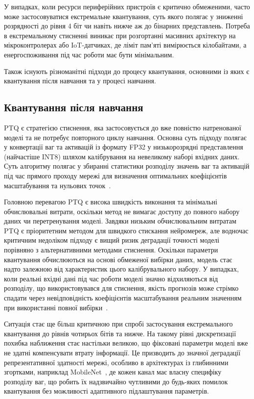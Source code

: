 \documentclass{pma-mthesis}
\begin{document}
У випадках, коли ресурси периферійних пристроїв є критично обмеженими, часто може застосовуватися екстремальне квантування, суть якого полягає у зниженні розрядності до рівня 4 біт чи навіть нижче аж до бінарних представлень. Потреба в екстремальному стисненні виникає при розгортанні масивних архітектур на мікроконтролерах або IoT-датчиках, де ліміт пам'яті вимірюється кілобайтами, а енергоспоживання під час роботи має бути мінімальним.

Також існують різноманітні підходи до процесу квантування, основними із яких є квантування після навчання та у процесі навчання.

\subsection{Квантування після навчання}

PTQ є стратегією стиснення, яка застосовується до вже повністю натренованої моделі та не потребує повторного циклу навчання. Основна суть підходу полягає у конвертації ваг та активацій із формату FP32 у низькорозрядні представлення (найчастіше INT8) шляхом калібрування на невеликому наборі вхідних даних. Суть алгоритму полягає у збиранні статистики розподілу значень ваг та активацій під час прямого проходу мережі для визначення оптимальних коефіцієнтів масштабування та нульових точок~\cite{krishnamoorthi2018quantizing}.

Головною перевагою PTQ є висока швидкість виконання та мінімальні обчислювальні витрати, оскільки метод не вимагає доступу до повного набору даних чи перетренування моделі. Завдяки низьким обчислювальним витратам PTQ є пріоритетним методом для швидкого стискання нейромереж, але водночас критичним недоліком підходу є вищий ризик деградації точності моделі порівняно з альтернативними методами стиснення. Оскільки параметри квантування обчислюються на основі обмеженої вибірки даних, модель стає надто залежною від характеристик цього калібрувального набору. У випадках, коли реальні вхідні дані під час роботи моделі значно відхиляються від розподілу, що використовувався для стиснення, якість прогнозів може стрімко спадати через невідповідність коефіцієнтів масштабування реальним значенням при використанні повної вибірки~\cite{krishnamoorthi2018quantizing}.

Ситуація стає ще більш критичною при спробі застосування екстремального квантування до рівнів чотирьох бітів та нижче. На такому рівні дискретизації похибка наближення стає настільки великою, що фіксовані параметри моделі вже не здатні компенсувати втрату інформації. Це призводить до значної деградації репрезентативної здатності мережі, особливо в архітектурах із глибинними згортками, наприклад MobileNet~\cite{howard2019searching}, де кожен канал має власну специфіку розподілу ваг, що робить їх надзвичайно чутливими до будь-яких помилок квантування без можливості адаптивного підлаштування параметрів.
\end{document}
